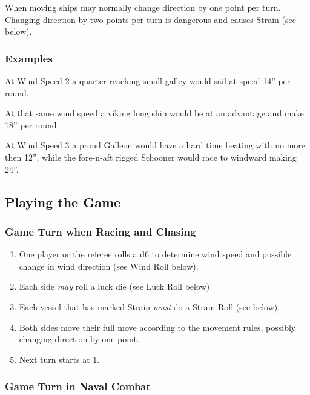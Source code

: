 \documentclass[11pt]{wbzine}
\begin{document}
\begin{multicols}{2}
When moving ships may normally change direction by one point per turn.
Changing direction by two points per turn is dangerous and causes Strain
(see below).


\subsubsection{Examples}

At Wind Speed 2 a quarter reaching small galley would sail at speed 14''
per round.

At that same wind speed a viking long ship would be at an advantage and
make 18'' per round.

At Wind Speed 3 a proud Galleon would have a hard time beating with no
more then 12'', while the fore-n-aft rigged Schooner would race to
windward making 24''.

\subsection{Playing the Game}

\subsubsection{Game Turn when Racing and
Chasing}

\begin{enumerate}
\item
  One player or the referee rolls a d6 to determine wind speed and
  possible change in wind direction (see Wind Roll below).
\item
  Each side \emph{may} roll a luck die (see Luck Roll below)
\item
  Each vessel that has marked Strain \emph{must} do a Strain Roll (see
  below).
\item
  Both sides move their full move according to the movement rules,
  possibly changing direction by one point.
\item
  Next turn starts at 1.
\end{enumerate}

\subsubsection{Game Turn in Naval Combat}


\end{multicols}
\end{document}
